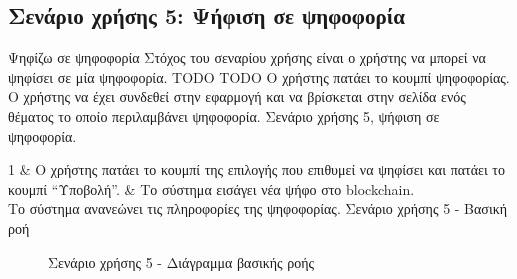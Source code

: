 \subsection{Σενάριο χρήσης 5: Ψήφιση σε ψηφοφορία} \label{subsection:3-4-use-case-vote-in-poll}

\useCaseTable
{Ψηφίζω σε ψηφοφορία}
{Στόχος του σεναρίου χρήσης είναι ο χρήστης να μπορεί να ψηφίσει σε μία ψηφοφορία.}
{TODO}
{TODO}
{Ο χρήστης πατάει το κουμπί ψηφοφορίας.}
{Ο χρήστης να έχει συνδεθεί στην εφαρμογή και να βρίσκεται στην σελίδα ενός θέματος το οποίο περιλαμβάνει ψηφοφορία.}
{Σενάριο χρήσης 5, ψήφιση σε ψηφοφορία.}
{\label{table:3-4-use-case-vote-in-poll}}

\useCaseBaseFlowTable
{
    1 & Ο χρήστης πατάει το κουμπί της επιλογής που επιθυμεί να ψηφίσει και πατάει το κουμπί ``Υποβολή''. & Το σύστημα εισάγει νέα ψήφο στο blockchain. \\ [0.5ex]
}
{Το σύστημα ανανεώνει τις πληροφορίες της ψηφοφορίας.}
{Σενάριο χρήσης 5 - Βασική ροή}
{\label{table:3-4-use-case-vote-in-poll-base-flow}}

\begin{figure}[H]
    \centering
    
    \caption{Σενάριο χρήσης 5 - Διάγραμμα βασικής ροής}
    \label{figure:3-4-use-case-vote-in-poll-base-flow-sequence-diagram}
\end{figure}
